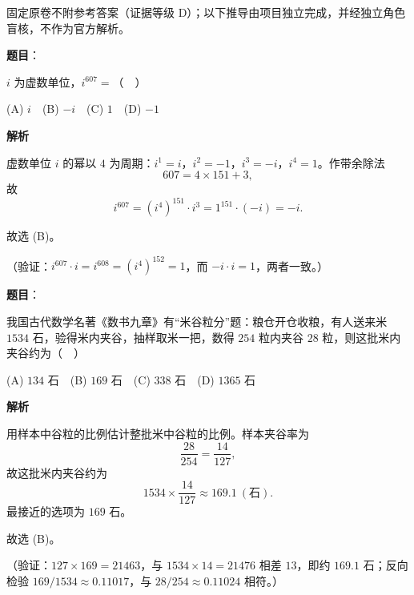 
\begin{gktip}
固定原卷不附参考答案（证据等级 D）；以下推导由项目独立完成，并经独立角色盲核，不作为官方解析。
\end{gktip}

\begin{answer}

\textbf{题目}：

\(i\) 为虚数单位，\(i^{607}=\)（　）

(A) \(i\)　(B) \(-i\)　(C) \(1\)　(D) \(-1\)

\textbf{解析}

虚数单位 \(i\) 的幂以 \(4\) 为周期：\(i^1=i\)，\(i^2=-1\)，\(i^3=-i\)，\(i^4=1\)。作带余除法
\nopagebreak[4]
\[
607=4\times151+3,
\]
故
\nopagebreak[4]
\[
i^{607}=(i^4)^{151}\cdot i^3=1^{151}\cdot(-i)=-i.
\]

故选 (B)。

（验证：\(i^{607}\cdot i=i^{608}=(i^4)^{152}=1\)，而 \(-i\cdot i=1\)，两者一致。）


\end{answer}
\begin{answer}

\textbf{题目}：

我国古代数学名著《数书九章》有“米谷粒分”题：粮仓开仓收粮，有人送来米 \(1534\) 石，验得米内夹谷，抽样取米一把，数得 \(254\) 粒内夹谷 \(28\) 粒，则这批米内夹谷约为（　）

(A) \(134\) 石　(B) \(169\) 石　(C) \(338\) 石　(D) \(1365\) 石

\textbf{解析}

用样本中谷粒的比例估计整批米中谷粒的比例。样本夹谷率为
\nopagebreak[4]
\[
\frac{28}{254}=\frac{14}{127},
\]
故这批米内夹谷约为
\nopagebreak[4]
\[
1534\times\frac{14}{127}\approx169.1\ (\text{石}).
\]
最接近的选项为 \(169\) 石。

故选 (B)。

（验证：\(127\times169=21463\)，与 \(1534\times14=21476\) 相差 \(13\)，即约 \(169.1\) 石；反向检验 \(169/1534\approx0.11017\)，与 \(28/254\approx0.11024\) 相符。）


\end{answer}
